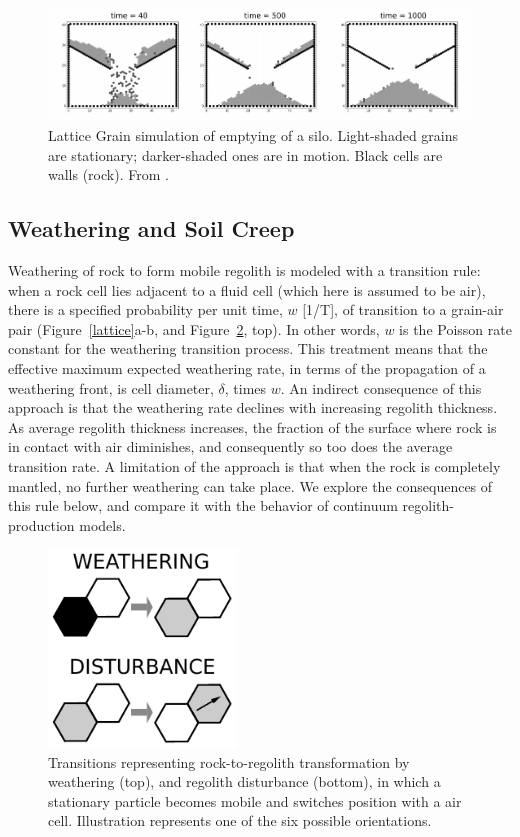 \documentclass[esurf, manuscript]{copernicus}
\begin{document}
\begin{figure}[t]
\includegraphics[width=12cm]{Figures/lattice_grain_silo.pdf}
\caption{Lattice Grain simulation of emptying of a silo. Light-shaded grains are stationary; darker-shaded ones are in motion. Black cells are walls (rock). From \citet{tucker2016celllab}.}
\label{silo}
\end{figure}

\subsection{Weathering and Soil Creep}

Weathering of rock to form mobile regolith is modeled with a transition rule: when a rock cell lies adjacent to a fluid cell (which here is assumed to be air), there is a specified probability per unit time, $w$ [1/T], of transition to a grain-air pair (Figure~\ref{lattice}a-b, and Figure~\ref{wxdist}, top). In other words, $w$ is the Poisson rate constant for the weathering transition process. This treatment means that the effective maximum expected weathering rate, in terms of the propagation of a weathering front, is cell diameter, $\delta$, times $w$. An indirect consequence of this approach is that the weathering rate declines with increasing regolith thickness. As average regolith thickness increases, the fraction of the surface where rock is in contact with air diminishes, and consequently so too does the average transition rate. A limitation of the approach is that when the rock is completely mantled, no further weathering can take place. We explore the consequences of this rule below, and compare it with the behavior of continuum regolith-production models.

\begin{figure}[t]
\includegraphics[width=5cm]{Figures/grain_hill_weathering_disturbance.pdf}
\caption{Transitions representing rock-to-regolith transformation by weathering (top), and regolith disturbance (bottom), in which a stationary particle becomes mobile and switches position with a air cell. Illustration represents one of the six possible orientations.}
\label{wxdist}
\end{figure}
\end{document}
